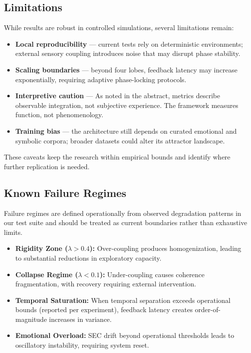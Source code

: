 \documentclass[11pt,a4paper]{article}
\begin{document}
\subsection{Limitations}

While results are robust in controlled simulations, several limitations remain:

\begin{itemize}
\item \textbf{Local reproducibility} --- current tests rely on deterministic environments; external sensory coupling introduces noise that may disrupt phase stability.
\item \textbf{Scaling boundaries} --- beyond four lobes, feedback latency may increase exponentially, requiring adaptive phase-locking protocols.
\item \textbf{Interpretive caution} --- As noted in the abstract, metrics describe observable integration, not subjective experience. The framework measures function, not phenomenology.
\item \textbf{Training bias} --- the architecture still depends on curated emotional and symbolic corpora; broader datasets could alter its attractor landscape.
\end{itemize}

These caveats keep the research within empirical bounds and identify where further replication is needed.

\subsection{Known Failure Regimes}

Failure regimes are defined operationally from observed degradation patterns in our test suite and should be treated as current boundaries rather than exhaustive limits.

\begin{itemize}
\item \textbf{Rigidity Zone (\(\lambda > 0.4\)):} Over-coupling produces homogenization, leading to substantial reductions in exploratory capacity.

\item \textbf{Collapse Regime (\(\lambda < 0.1\)):} Under-coupling causes coherence fragmentation, with recovery requiring external intervention.

\item \textbf{Temporal Saturation:} When temporal separation exceeds operational bounds (reported per experiment), feedback latency creates order-of-magnitude increases in variance.
\item \textbf{Emotional Overload:} SEC drift beyond operational thresholds leads to oscillatory instability, requiring system reset.
\end{itemize}
\end{document}
